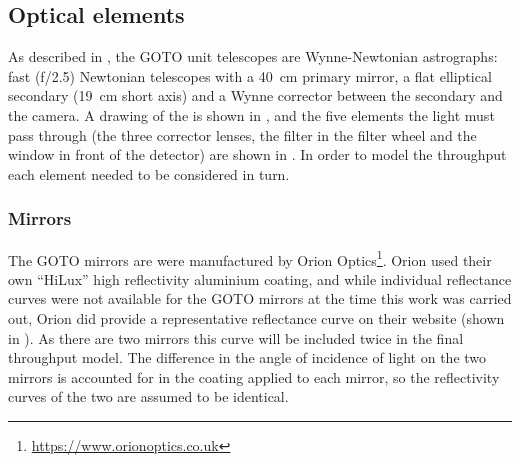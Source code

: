 \subsection{Optical elements}
\label{sec:optics}
\begin{colsection}

As described in , the GOTO unit telescopes are Wynne-Newtonian astrographs: fast (f/2.5) Newtonian telescopes with a \SI{40}{\centi\meter} primary mirror, a flat elliptical secondary (\SI{19}{\centi\metre} short axis) and a Wynne corrector between the secondary and the camera. A drawing of the  is shown in , and the five elements the light must pass through (the three corrector lenses, the filter in the filter wheel and the window in front of the detector) are shown in . In order to model the throughput each element needed to be considered in turn.

\subsubsection{Mirrors}

The GOTO mirrors are were manufactured by Orion Optics\footnote{\url{https://www.orionoptics.co.uk}}. Orion used their own ``HiLux'' high reflectivity aluminium coating, and while individual reflectance curves were not available for the GOTO mirrors at the time this work was carried out, Orion did provide a representative reflectance curve on their website (shown in ). As there are two mirrors this curve will be included twice in the final throughput model. The difference in the angle of incidence of light on the two mirrors is accounted for in the coating applied to each mirror, so the reflectivity curves of the two are assumed to be identical.

\newpage


\end{colsection}
